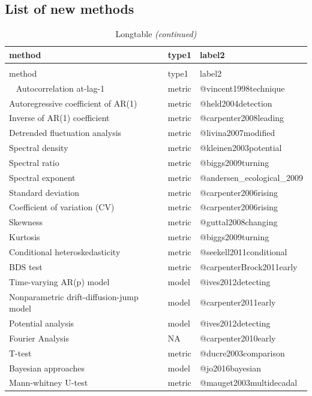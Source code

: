 \documentclass[12pt,twoside,openany]{reedthesis}
\begin{document}
\subsection{List of new methods}\label{list-of-new-methods}
\begin{longtable}{lll}
\caption{\label{tab:methodsMetricsListTab1}Longtable}\\
\toprule
method & type1 & label2\\
\midrule
\endfirsthead
\caption[]{\label{tab:methodsMetricsListTab1}Longtable \textit{(continued)}}\\
\toprule
method & type1 & label2\\
\midrule
\endhead
\
\endfoot
\bottomrule
\endlastfoot
Autocorrelation at-lag-1 & metric & @vincent1998technique\\
Autoregressive coefficient of AR(1) & metric & @held2004detection\\
Inverse of AR(1) coefficient & metric & @carpenter2008leading\\
Detrended fluctuation analysis & metric & @livina2007modified\\
Spectral density & metric & @kleinen2003potential\\
\addlinespace
Spectral ratio & metric & @biggs2009turning\\
Spectral exponent & metric & @andersen\_ecological\_2009\\
Standard deviation & metric & @carpenter2006rising\\
Coefficient of variation (CV) & metric & @carpenter2006rising\\
Skewness & metric & @guttal2008changing\\
\addlinespace
Kurtosis & metric & @biggs2009turning\\
Conditional heteroskedasticity & metric & @seekell2011conditional\\
BDS test & metric & @carpenterBrock2011early\\
Time-varying AR(p) model & model & @ives2012detecting\\
Nonparametric drift-diffusion-jump model & model & @carpenter2011early\\
\addlinespace
Potential analysis & model & @ives2012detecting\\
Fourier Analysis & NA & @carpenter2010early\\
T-test & metric & @ducre2003comparison\\
Bayesian approaches & model & @jo2016bayesian\\
Mann-whitney U-test & metric & @mauget2003multidecadal\\

\end{longtable}
\end{document}
